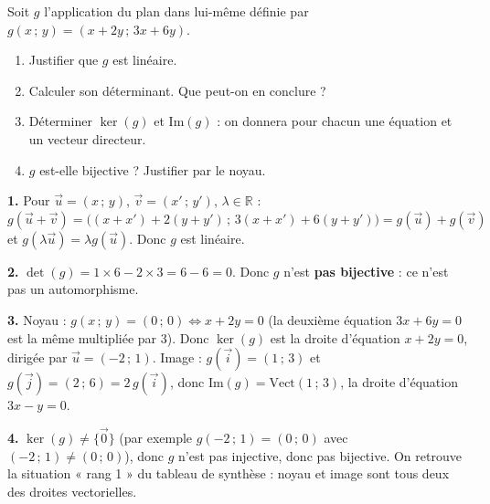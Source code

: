 \documentclass[11pt]{article}
\begin{document}
\begin{exercice}
Soit $g$ l'application du plan dans lui-même définie par $g(x\,;\,y) = (x + 2y\,;\,3x + 6y)$.
\begin{enumerate}
\item Justifier que $g$ est linéaire.
\item Calculer son déterminant. Que peut-on en conclure ?
\item Déterminer $\ker(g)$ et $\mathrm{Im}(g)$ : on donnera pour chacun une équation et un vecteur directeur.
\item $g$ est-elle bijective ? Justifier par le noyau.
\end{enumerate}
\end{exercice}

\begin{corrige}
\textbf{1.} Pour $\vec{u} = (x\,;\,y)$, $\vec{v} = (x'\,;\,y')$, $\lambda \in \mathbb{R}$ : $g(\vec{u} + \vec{v}) = \big((x+x') + 2(y+y')\,;\,3(x+x') + 6(y+y')\big) = g(\vec{u}) + g(\vec{v})$ et $g(\lambda \vec{u}) = \lambda g(\vec{u})$. Donc $g$ est linéaire.

\textbf{2.} $\det(g) = 1 \times 6 - 2 \times 3 = 6 - 6 = 0$. Donc $g$ n'est \textbf{pas bijective} : ce n'est pas un automorphisme.

\textbf{3.} Noyau : $g(x\,;\,y) = (0\,;\,0) \iff x + 2y = 0$ (la deuxième équation $3x + 6y = 0$ est la même multipliée par $3$). Donc $\ker(g)$ est la droite d'équation $x + 2y = 0$, dirigée par $\vec{u} = (-2\,;\,1)$. Image : $g(\vec{i}) = (1\,;\,3)$ et $g(\vec{j}) = (2\,;\,6) = 2\,g(\vec{i})$, donc $\mathrm{Im}(g) = \mathrm{Vect}(1\,;\,3)$, la droite d'équation $3x - y = 0$.

\textbf{4.} $\ker(g) \neq \{\vec{0}\}$ (par exemple $g(-2\,;\,1) = (0\,;\,0)$ avec $(-2\,;\,1) \neq (0\,;\,0)$), donc $g$ n'est pas injective, donc pas bijective. On retrouve la situation « rang 1 » du tableau de synthèse : noyau et image sont tous deux des droites vectorielles.
\end{corrige}
\end{document}
